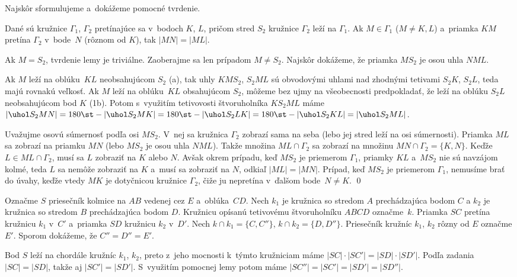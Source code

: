 {%
Najskôr sformulujeme a~dokážeme pomocné tvrdenie.

\Lema
Dané sú kružnice $\Gamma_1$, $\Gamma_2$ pretínajúce sa v~bodoch $K$, $L$, pričom stred $S_2$ kružnice $\Gamma_2$ leží na $\Gamma_1$.
Ak $M\in\Gamma_1$ ($M\ne K,L$) a~priamka $KM$ pretína $\Gamma_2$ v~bode~$N$ (rôznom od $K$), tak $|MN|=|ML|$.

\dokaz
Ak $M=S_2$, tvrdenie lemy je triviálne. Zaoberajme sa len prípadom $M\ne S_2$. Najskôr dokážeme, že priamka $MS_2$ je osou uhla $NML$.

Ak $M$ leží na oblúku~$KL$ neobsahujúcom $S_2$ (\obr{}a), tak uhly $KMS_2$, $S_2ML$ sú obvodovými uhlami nad zhodnými tetivami $S_2K$, $S_2L$, teda majú rovnakú veľkosť. Ak $M$ leží na oblúku~$KL$ obsahujúcom $S_2$, môžeme bez ujmy na všeobecnosti predpokladať, že leží na oblúku $S_2L$ neobsahujúcom bod $K$ (\obrr1b). Potom s~využitím tetivovosti štvoruholníka $KS_2ML$ máme $|\uhol S_2MN|=180\st-|\uhol S_2MK|=180\st-|\uhol S_2LK|=180\st-|\uhol S_2KL|=|\uhol S_2ML|$.
%

Uvažujme osovú súmernosť podľa osi $MS_2$. V~nej sa kružnica $\Gamma_2$ zobrazí sama na seba (lebo jej stred leží na osi súmernosti). Priamka $ML$ sa zobrazí na priamku $MN$ (lebo $MS_2$ je osou uhla $NML$). Takže množina $ML\cap\Gamma_2$ sa zobrazí na množinu ${MN\cap\Gamma_2}=\{K,N\}$. Keďže $L\in ML\cap\Gamma_2$, musí sa $L$ zobraziť na $K$ alebo $N$. Avšak okrem prípadu, keď $MS_2$ je priemerom $\Gamma_1$, priamky $KL$ a~$MS_2$ nie sú navzájom kolmé, teda $L$ sa nemôže zobraziť na $K$ a~musí sa zobraziť na $N$, odkiaľ $|ML|=|MN|$. Prípad, keď $MS_2$ je priemerom $\Gamma_1$, nemusíme brať do úvahy, keďže vtedy $MK$ je dotyčnicou kružnice $\Gamma_2$, čiže ju nepretína v~ďalšom bode~$N\ne K$.
\qed

\smallskip
Označme $S$ priesečník kolmice na $AB$ vedenej cez $E$ a~oblúka~$CD$. Nech $k_1$ je kružnica so stredom $A$ prechádzajúca bodom $C$ a $k_2$ je kružnica so stredom $B$ prechádzajúca bodom $D$. Kružnicu opísanú tetivovému štvoruholníku $ABCD$ označme~$k$. Priamka $SC$ pretína kružnicu $k_1$ v~$C'$ a~priamka $SD$ kružnicu $k_2$ v~$D'$. Nech ${k\cap k_1}=\{C,C''\}$, ${k\cap k_2}=\{D,D''\}$. Priesečník kružníc $k_1$, $k_2$ rôzny od $E$ označme $E'$. Sporom dokážeme, že $C'' = D''= E'$.

Bod $S$ leží na chordále kružníc $k_1$, $k_2$, preto z~jeho mocnosti k~týmto kružniciam máme $|SC|\cdot|SC'|=|SD|\cdot|SD'|$. Podľa zadania $|SC|=|SD|$, takže aj $|SC'|=|SD'|$. S~využitím pomocnej lemy potom máme $|SC''|=|SC'|=|SD'|=|SD''|$.

}
